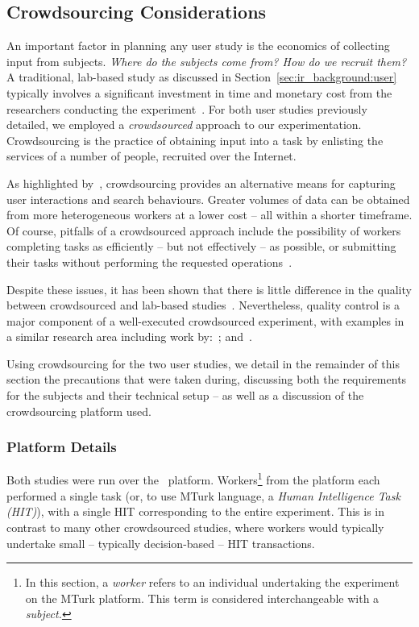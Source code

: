 \subsection{Crowdsourcing Considerations}\label{sec:methodology:user:crowdsourcing}
An important factor in planning any user study is the economics of collecting input from subjects. \emph{Where do the subjects come from? How do we recruit them?} A traditional, lab-based study as discussed in Section~\ref{sec:ir_background:user} typically involves a significant investment in time and monetary cost from the researchers conducting the experiment~\citep{spool2001testing}. For both user studies previously detailed, we employed a \emph{crowdsourced} approach to our experimentation. Crowdsourcing is the practice of obtaining input into a task by enlisting the services of a number of people, recruited over the Internet.

As highlighted by~\cite{zuccon2013crowdsourcing_comparisons}, crowdsourcing provides an alternative means for capturing user interactions and search behaviours. Greater volumes of data can be obtained from more heterogeneous workers at a lower cost -- all within a shorter timeframe. Of course, pitfalls of a crowdsourced approach include the possibility of workers completing tasks as efficiently -- but not effectively -- as possible, or submitting their tasks without performing the requested operations~\citep{feild2010turkers}.

Despite these issues, it has been shown that there is little difference in the quality between crowdsourced and lab-based studies~\citep{kely2011user_study, zuccon2013crowdsourcing_comparisons}. Nevertheless, quality control is a major component of a well-executed crowdsourced experiment, with examples in a similar research area including work by:~\cite{kazai2011crowdsourced, crescenzi2013crowdsourced}; and~\cite{bota2016information_cards}.

Using crowdsourcing for the two user studies, we detail in the remainder of this section the precautions that were taken during, discussing both the requirements for the subjects and their technical setup -- as well as a discussion of the crowdsourcing platform used.

\subsubsection{Platform Details}\label{sec:methodology:user:crowdsourcing:platform}
Both studies were run over the~ platform. Workers\footnote{In this section, a \emph{worker} refers to an individual undertaking the experiment on the MTurk platform. This term is considered interchangeable with a \emph{subject.}} from the platform each performed a single task (or, to use MTurk language, a \emph{Human Intelligence Task (HIT)}), with a single HIT corresponding to the entire experiment. This is in contrast to many other crowdsourced studies, where workers would typically undertake small -- typically decision-based -- HIT transactions.

